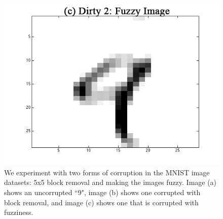 \begin{figure}[ht]
 \includegraphics[scale=0.20]{exp/fuzzy.png}
 \caption{We experiment with two forms of corruption in the MNIST image datasets: 5x5 block removal and making the images fuzzy. Image (a) shows an uncorrupted ``9", image (b) shows one corrupted with block removal, and image (c) shows one that is corrupted with fuzziness. \label{mnist-corr}}
\end{figure}
